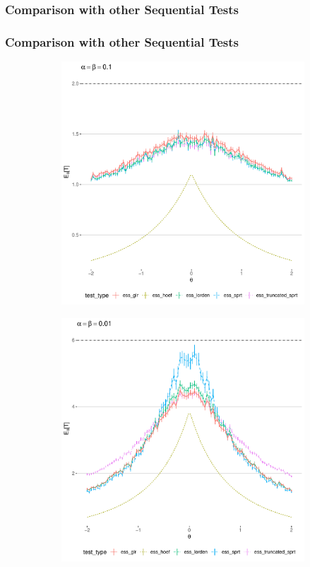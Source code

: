 \documentclass[10pt]{beamer}
\begin{document}
\begin{frame}
\frametitle{Comparison with other Sequential Tests}

\end{frame}

\begin{frame}
\frametitle{Comparison with other Sequential Tests}

\begin{figure}
\centering
\begin{subfigure}{0.49\textwidth}
    \includegraphics[width=\textwidth]{images/ess_alpha1e1}
\end{subfigure}
\hfill
\begin{subfigure}{0.49\textwidth}
    \includegraphics[width=\textwidth]{images/ess_alpha1e2}
\end{subfigure}
\end{figure}


\end{frame}
\end{document}
